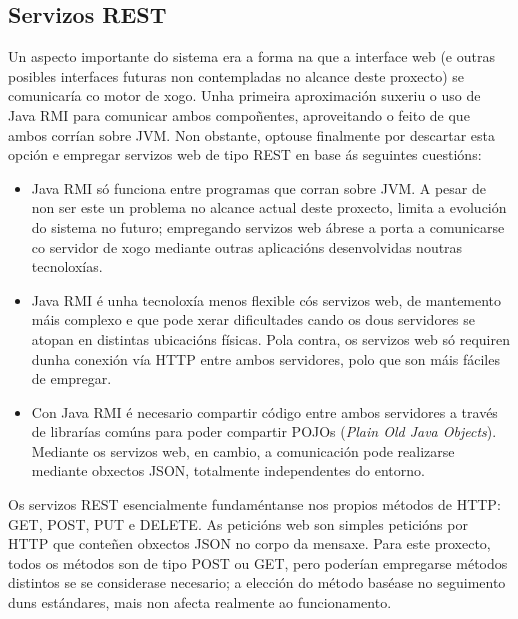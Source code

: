 \subsection{Servizos REST}
Un aspecto importante do sistema era a forma na que a interface web (e outras
posibles interfaces futuras non contempladas no alcance deste proxecto) se
comunicaría co motor de xogo. Unha primeira aproximación suxeriu o uso de
Java RMI para comunicar ambos compoñentes, aproveitando o feito de que ambos
corrían sobre JVM. Non obstante, optouse finalmente por descartar esta
opción e empregar servizos web de tipo REST en base ás seguintes cuestións:
\begin{itemize}
  \item Java RMI só funciona entre programas que corran sobre JVM. A pesar de
  non ser este un problema no alcance actual deste proxecto, limita a evolución
  do sistema no futuro; empregando servizos web ábrese a porta a comunicarse co
  servidor de xogo mediante outras aplicacións desenvolvidas noutras
  tecnoloxías.
  \item Java RMI é unha tecnoloxía menos flexible cós servizos web, de
  mantemento máis complexo e que pode xerar dificultades cando os dous
  servidores se atopan en distintas ubicacións físicas. Pola contra, os servizos
  web só requiren dunha conexión vía HTTP entre ambos servidores, polo que son
  máis fáciles de empregar.
  \item Con Java RMI é necesario compartir código entre ambos servidores a
  través de librarías comúns para poder compartir POJOs (\textit{Plain Old
  Java Objects}). Mediante os servizos web, en cambio, a comunicación pode
  realizarse mediante obxectos JSON, totalmente independentes do entorno.
\end{itemize}
Os servizos REST esencialmente fundaméntanse nos propios métodos de HTTP: GET,
POST, PUT e DELETE. As peticións web son simples peticións por HTTP que conteñen
obxectos JSON no corpo da mensaxe. Para este proxecto, todos os métodos son de
tipo POST ou GET, pero poderían empregarse métodos distintos se se considerase
necesario; a elección do método baséase no seguimento duns estándares, mais non
afecta realmente ao funcionamento.

